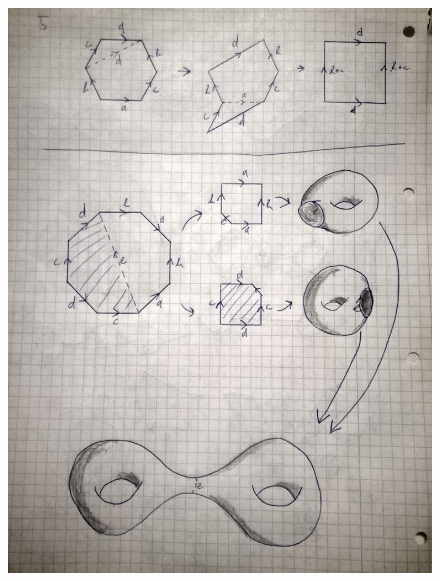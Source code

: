 \documentclass[a4paper,11pt,notitlepage,fullpage]{article}
\begin{document}
\begin{enumerate}
\begin{figure}
\centering
\includegraphics[width = \textwidth]{ue_img/9_5}
\end{figure}


\end{enumerate}
\end{document}
